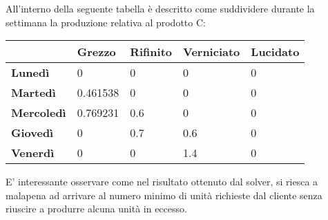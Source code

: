 \documentclass[12pt]{article}
\begin{document}
All'interno della seguente tabella è descritto come suddividere durante la settimana la produzione relativa al prodotto C:
\begin{table}[H]
	\centering
	\setlength{\tabcolsep}{15pt} %
	\renewcommand{\arraystretch}{2} %
	\begin{center}
		\begin{tabular}{|l|l|l|l|l|}
			\hline
			& \textbf{Grezzo} & \textbf{Rifinito} & \textbf{Verniciato} & \textbf{Lucidato} \\ \hline
			\textbf{Lunedì}    & 0               & 0                 & 0                   & 0                 \\ \hline
			\textbf{Martedì}   & 0.461538               & 0              & 0                   & 0                 \\ \hline
			\textbf{Mercoledì} & 0.769231             & 0.6                 & 0             & 0                 \\ \hline
			\textbf{Giovedì}   & 0               & 0.7              & 0.6                   & 0                 \\ \hline
			\textbf{Venerdì}   & 0               & 0                 & 1.4               & 0                 \\ \hline
		\end{tabular}
	\end{center}
\end{table}
E' interessante osservare come nel risultato ottenuto dal solver, si riesca a malapena ad arrivare al numero minimo di unità richieste dal cliente senza riuscire a produrre alcuna unità in eccesso.
\end{document}
